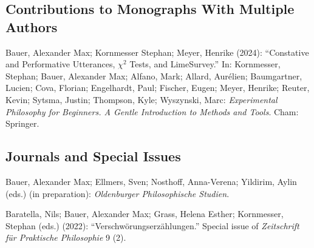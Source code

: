 \documentclass[a4paper,10pt]{article}
\newenvironment{literature}{%
   \parskip6pt\parindent0pt\raggedright
   \def\lititem{\hangindent=1cm\hangafter1}}{%
   \par\ignorespaces}
\begin{document}
\subsection*{Contributions to Monographs With Multiple Authors}
\begin{literature}
\lititem Bauer, Alexander Max; Kornmesser Stephan; Meyer, Henrike (2024): \enquote{Constative and Performative Utterances, $\chi^2$ Tests, and LimeSurvey.} In: Kornmesser, Stephan; Bauer, Alexander Max; Alfano, Mark; Allard, Aurélien; Baumgartner, Lucien; Cova, Florian; Engelhardt, Paul; Fischer, Eugen; Meyer, Henrike; Reuter, Kevin; Sytsma, Justin; Thompson, Kyle; Wyszynski, Marc: \textit{Experimental Philosophy for Beginners. A Gentle Introduction to Methods and Tools}. Cham: Springer.
\end{literature}


\subsection*{Journals and Special Issues}
\begin{literature}
\lititem Bauer, Alexander Max; Ellmers, Sven; Nosthoff, Anna-Verena; Yildirim, Aylin (eds.) (in preparation): \textit{Oldenburger Philosophische Studien}.

\lititem Baratella, Nils; Bauer, Alexander Max; Grass, Helena Esther; Kornmesser, Stephan (eds.) (2022): \enquote{Verschwörungserzählungen.} Special issue of \textit{Zeitschrift für Praktische Philosophie} 9 (2).
\end{literature}


\end{document}
